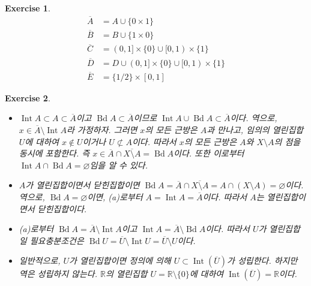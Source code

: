 \documentclass{article}
\newtheorem{exercise}{Exercise}[section]
\newcommand{\R}{\mathbb{R}}
\begin{document}
\begin{exercise}
    \begin{align*}
        \overline{A}&=A\cup\{0\times 1\}\\
        \overline{B}&=B\cup\{1\times0\}\\
        \overline{C}&=(0,1]\times\{0\}\cup[0,1)\times\{1\}\\
        \overline{D}&=D\cup(0,1]\times\{0\}\cup[0,1)\times\{1\}\\
        \overline{E}&=\{1/2\}\times[0,1]
    \end{align*}
\end{exercise}

\begin{exercise}
    \phantom{}
    \begin{itemize}
        \item[(a)] $\operatorname{Int}A\subset A\subset\overline{A}$이고 $\operatorname{Bd}A\subset\overline{A}$이므로 $\operatorname{Int}A\cup\operatorname{Bd}A\subset\overline{A}$이다. 역으로, $x\in\overline{A}\setminus\operatorname{Int}A$라 가정하자. 그러면 $x$의 모든 근방은 $A$과 만나고, 임의의 열린집합 $U$에 대하여 $x\notin U$이거나 $U\not\subset A$이다. 따라서 $x$의 모든 근방은 $A$와 $X\setminus A$의 점을 동시에 포함한다. 즉 $x\in\overline{A}\cap\overline{X\setminus A}=\operatorname{Bd}A$이다. 또한 이로부터 $\operatorname{Int}A\cap\operatorname{Bd}A=\varnothing$임을 알 수 있다.
        \item[(b)] $A$가 열린집합이면서 닫힌집합이면 $\operatorname{Bd}A=\overline{A}\cap\overline{X\setminus A}=A\cap(X\setminus A)=\varnothing$이다. 역으로, $\operatorname{Bd}A=\varnothing$이면, (a)로부터 $A=\operatorname{Int} A=\overline{A}$이다. 따라서 $A$는 열린집합이면서 닫힌집합이다.
        \item[(c)] (a)로부터 $\operatorname{Bd}A=\overline{A}\setminus\operatorname{Int}A$이고 $\operatorname{Int}A=\overline{A}\setminus\operatorname{Bd}A$이다. 따라서 $U$가 열린집합일 필요충분조건은 $\operatorname{Bd}U=\overline{U}\setminus\operatorname{Int}U=\overline{U}\setminus U$이다.
        \item[(d)] 일반적으로, $U$가 열린집합이면 정의에 의해 $U\subset\operatorname{Int}(\overline{U})$가 성립한다. 하지만 역은 성립하지 않는다. $\R$의 열린집합 $U=\R\setminus\{0\}$에 대하여 $\operatorname{Int}(\overline{U})=\R$이다.
    \end{itemize}
\end{exercise}
\end{document}
